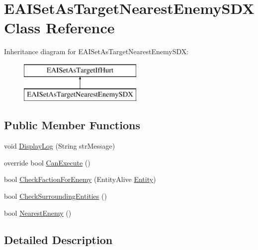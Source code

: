 \hypertarget{class_e_a_i_set_as_target_nearest_enemy_s_d_x}{}\section{E\+A\+I\+Set\+As\+Target\+Nearest\+Enemy\+S\+DX Class Reference}
\label{class_e_a_i_set_as_target_nearest_enemy_s_d_x}
Inheritance diagram for E\+A\+I\+Set\+As\+Target\+Nearest\+Enemy\+S\+DX\+:\begin{figure}[H]
\begin{center}
\leavevmode
\includegraphics[height=2.000000cm]{class_e_a_i_set_as_target_nearest_enemy_s_d_x}
\end{center}
\end{figure}
\subsection*{Public Member Functions}
\begin{DoxyCompactItemize}
\item 
void \mbox{\hyperlink{class_e_a_i_set_as_target_nearest_enemy_s_d_x_a628fcb008c20c6a59f8663fb57c719fe}{Display\+Log}} (String str\+Message)
\item 
override bool \mbox{\hyperlink{class_e_a_i_set_as_target_nearest_enemy_s_d_x_a3ec7b2bfb9923c2bf0c499c98b808ab2}{Can\+Execute}} ()
\item 
bool \mbox{\hyperlink{class_e_a_i_set_as_target_nearest_enemy_s_d_x_ab390e79641b3e56767329a36c6bc11fc}{Check\+Faction\+For\+Enemy}} (Entity\+Alive \mbox{\hyperlink{_the_01_restless_01_curse_2_config_2_localization_8txt_a831452d5736d8c492ddd792b09c12cde}{Entity}})
\item 
bool \mbox{\hyperlink{class_e_a_i_set_as_target_nearest_enemy_s_d_x_ac55dbb450589d7d1a9108d6a4cd74f03}{Check\+Surrounding\+Entities}} ()
\item 
bool \mbox{\hyperlink{class_e_a_i_set_as_target_nearest_enemy_s_d_x_a7a78d543de832cbace9a0a7d0c7b0cdd}{Nearest\+Enemy}} ()
\end{DoxyCompactItemize}


\subsection{Detailed Description}


